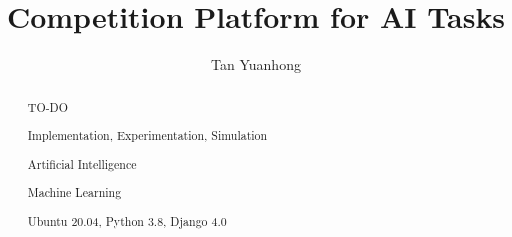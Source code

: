 \documentclass[fyp]{socreport}
\begin{document}
\title{Competition Platform for AI Tasks}
\author{Tan Yuanhong}
\maketitle
\begin{abstract}
TO-DO

\begin{project-nature}
	Implementation, Experimentation, Simulation
\end{project-nature}
\begin{keywords}
    \item Artificial Intelligence
	\item Machine Learning
\end{keywords}
\begin{implement}
	Ubuntu 20.04, Python 3.8, Django 4.0
\end{implement}
\end{abstract}


\tableofcontents 
\end{document}
